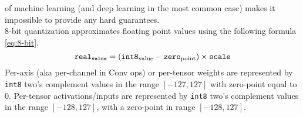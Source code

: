 of machine learning (and deep learning in the most common case) makes it
impossible to provide any hard guarantees.\cite{tflite-8bit}\\
8-bit quantization approximates floating point values using the following
formula \eqref{eq:8-bit}.
\begin{equation}
\label{eq:8-bit}
\text{\texttt{real}}_\text{\texttt{value}} = ({\text{\texttt{int8}}_\text{value}-\text{\texttt{zero}}_\text{point}}) \times \text{\texttt{scale}} 
\end{equation}
%
Per-axis (aka per-channel in Conv ops) or per-tensor weights are represented by
\texttt{int8} two’s complement values in the range $[-127, 127]$ with zero-point equal to $0$. Per-tensor activations/inputs are represented by \texttt{int8} two’s
complement values in the range $[-128, 127]$, with a zero-point in range $[-128,
127]$.
%
%
